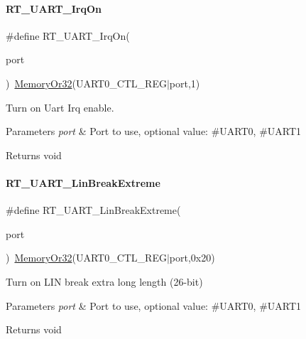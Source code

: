 \paragraph{\texorpdfstring{R\+T\+\_\+\+U\+A\+R\+T\+\_\+\+Irq\+On}{RT\_UART\_IrqOn}}
{\footnotesize\ttfamily \#define R\+T\+\_\+\+U\+A\+R\+T\+\_\+\+Irq\+On(\begin{DoxyParamCaption}\item[{}]{port }\end{DoxyParamCaption})~\mbox{\hyperlink{a00020_a9ea92ebccdef6bdaca4d00210cc7266d}{Memory\+Or32}}(U\+A\+R\+T0\+\_\+\+C\+T\+L\+\_\+\+R\+EG$\vert$port,1)}



Turn on Uart Irq enable. 


\begin{DoxyParams}{Parameters}
{\em port} & Port to use, optional value\+: \#\+U\+A\+R\+T0, \#\+U\+A\+R\+T1 \\
\hline
\end{DoxyParams}
\begin{DoxyReturn}{Returns}
void 
\end{DoxyReturn}
\mbox{\label{a00056_a9e7d98206f07485a3347bab6672a971c}} 
\paragraph{\texorpdfstring{R\+T\+\_\+\+U\+A\+R\+T\+\_\+\+Lin\+Break\+Extreme}{RT\_UART\_LinBreakExtreme}}
{\footnotesize\ttfamily \#define R\+T\+\_\+\+U\+A\+R\+T\+\_\+\+Lin\+Break\+Extreme(\begin{DoxyParamCaption}\item[{}]{port }\end{DoxyParamCaption})~\mbox{\hyperlink{a00020_a9ea92ebccdef6bdaca4d00210cc7266d}{Memory\+Or32}}(U\+A\+R\+T0\+\_\+\+C\+T\+L\+\_\+\+R\+EG$\vert$port,0x20)}



Turn on L\+IN break extra long length (26-\/bit) 


\begin{DoxyParams}{Parameters}
{\em port} & Port to use, optional value\+: \#\+U\+A\+R\+T0, \#\+U\+A\+R\+T1 \\
\hline
\end{DoxyParams}
\begin{DoxyReturn}{Returns}
void 
\end{DoxyReturn}
\mbox{\label{a00056_a45d1e1116c5b535f276acc73e522570f}} 
